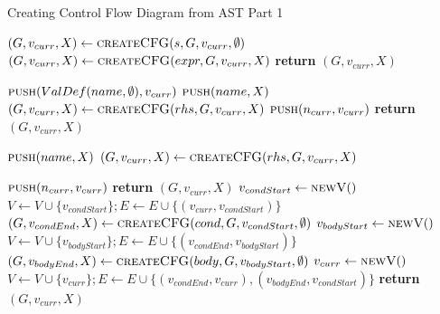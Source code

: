 \begin{algorithm}[h]

\caption{Creating Control Flow Diagram from AST Part 1}\label{CFG}
\begin{algorithmic}[1]
  	\State $(G,v_{curr},X)\gets \Call{createCFG}{s,G, v_{curr},\emptyset}$
   	\EndFor  
    \State $(G,v_{curr},X)\gets \Call{createCFG}{expr,G, v_{curr},X}$
       	\State \textbf{return} $(G,v_{curr},X)$
      \EndCase
       
  			\State $\Call{push}{ValDef(name,\emptyset),v_{curr}} $
  			\State $\Call{push}{name,X} $
  			\State $(G,v_{curr},X)\gets \Call{createCFG}{rhs,G, v_{curr},X} $
  		\Else
  			\State $\Call{push}{n_{curr}, v_{curr}} $
  		\EndIf
  	\State \textbf{return} $(G,v_{curr},X)$
  \EndCase

    		\State $\Call{push}{name,X} $
    		\State $(G,v_{curr},X)\gets \Call{createCFG}{rhs,G, v_{curr},X} $

    	\Else
    			\State $\Call{push}{n_{curr}, v_{curr}} $
    		\EndIf
    	\State \textbf{return} $(G,v_{curr},X)$
  \EndCase
  	\State $v_{condStart} \gets \Call{newV}$
  	\State $V \gets V \cup \{v_{condStart}\}; E \gets E \cup \{(v_{curr},v_{condStart})\}$ 
  	\State $(G,v_{condEnd},X)\gets \Call{createCFG}{cond,G,v_{condStart},\emptyset} $
  	\State $v_{bodyStart} \gets \Call{newV}{ }$
  	\State $V \gets V \cup \{v_{bodyStart}\}; E \gets E \cup \{(v_{condEnd},v_{bodyStart})\}$
  	\State $(G,v_{bodyEnd},X)\gets \Call{createCFG}{body,G, v_{bodyStart},\emptyset} $
  	\State $v_{curr} \gets \Call{newV}{ }$
  	\State $V \gets V \cup \{v_{curr}\}; E \gets E \cup \{(v_{condEnd},v_{curr}),(v_{bodyEnd},v_{condStart})\}$
  	\State \textbf{return} $(G,v_{curr},X)$
  \EndCase
 \end{algorithmic}
 \end{algorithm}
